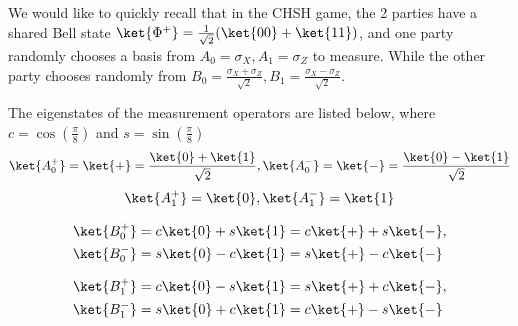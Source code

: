 We would like to quickly recall that in the CHSH game, the 2 parties have a shared Bell state $\ket{\Phi^+}=\frac{1}{\sqrt{2}}(\ket{00}+\ket{11})$, and one party randomly chooses a basis from $A_0=\sigma_X, A_1=\sigma_Z$ to measure. While the other party chooses randomly from $B_0=\frac{\sigma_X+\sigma_Z}{\sqrt{2}}, B_1=\frac{\sigma_X-\sigma_Z}{\sqrt{2}}$.

The eigenstates of the measurement operators are listed below, where $c=\cos\left(\frac{\pi}{8}\right)$ and $s = \sin\left(\frac{\pi}{8}\right)$
    \begin{equation}
        \ket{A_0^+}=\ket{+}=\frac{\ket{0}+\ket{1}}{\sqrt{2}}, \ket{A_0^-}=\ket{-}=\frac{\ket{0}-\ket{1}}{\sqrt{2}}
    \end{equation}
    \begin{equation}
        \ket{A_1^+}=\ket{0}, \ket{A_1^-}=\ket{1}
    \end{equation}

    \begin{equation}
    \begin{split}
        \ket{B_0^+}&=c\ket{0}+s\ket{1}=c\ket{+}+s\ket{-},\\
        \ket{B_0^-}&=s\ket{0}-c\ket{1} =s\ket{+}-c\ket{-}
    \end{split}
    \end{equation}
    
    \begin{equation}
    \begin{split}
        \ket{B_1^+}&=c\ket{0}-s\ket{1}=s\ket{+}+c\ket{-},\\
        \ket{B_1^-}&=s\ket{0}+c\ket{1} = c\ket{+}-s\ket{-}
    \end{split}
    \end{equation}

